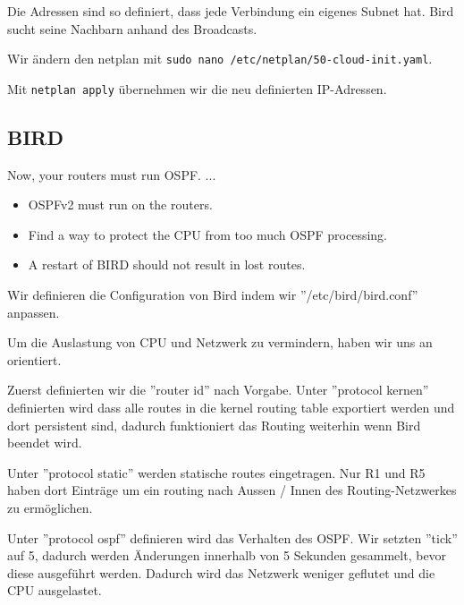 \documentclass[11pt,titlepage]{article}
\newenvironment{shadedquotation}
 {\begin{shaded*}
  \quoting[leftmargin=0pt, vskip=0pt]
 }
 {\endquoting
 \end{shaded*}
}
\begin{document}
Die Adressen sind so definiert, dass jede Verbindung ein eigenes Subnet hat. Bird sucht seine Nachbarn anhand des Broadcasts.

Wir ändern den netplan mit \lstinline!sudo nano /etc/netplan/50-cloud-init.yaml!.



Mit \lstinline!netplan apply! übernehmen wir die neu definierten IP-Adressen.

\subsection{BIRD}
\label{subsec:BIRD}
\begin{shadedquotation}
  Now, your routers must run OSPF. ...
  \begin{itemize}
    \item OSPFv2 must run on the routers.
    \item Find a way to protect the CPU from too much OSPF processing.
    \item A restart of BIRD should not result in lost routes.
  \end{itemize}
\end{shadedquotation}

Wir definieren die Configuration von Bird indem wir ''/etc/bird/bird.conf'' anpassen.

Um die Auslastung von CPU und Netzwerk zu vermindern, haben wir uns an \cite{ReducingBGP} orientiert.



Zuerst definierten wir die ''router id'' nach Vorgabe.
\medskip
Unter ''protocol kernen'' definierten wird dass alle routes in die kernel routing table exportiert werden und dort persistent sind, dadurch funktioniert das Routing weiterhin wenn Bird beendet wird.

\medskip
Unter ''protocol static'' werden statische routes eingetragen. Nur R1 und R5 haben dort Einträge um ein routing nach Aussen / Innen des Routing-Netzwerkes zu ermöglichen.

\medskip
Unter ''protocol ospf'' definieren wird das Verhalten des OSPF. Wir setzten ''tick'' auf 5, dadurch werden Änderungen innerhalb von 5 Sekunden gesammelt, bevor diese ausgeführt werden. Dadurch wird das Netzwerk weniger geflutet und die CPU ausgelastet.
\end{document}
